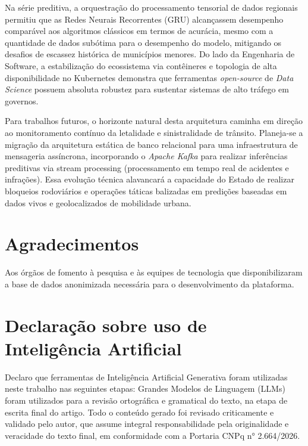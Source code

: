 \documentclass[10pt,conference]{IEEEtran}
\begin{document}
Na série preditiva, a orquestração do processamento tensorial de dados regionais permitiu que as Redes Neurais Recorrentes (GRU) alcançassem desempenho comparável aos algoritmos clássicos em termos de acurácia, mesmo com a quantidade de dados subótima para o desempenho do modelo, mitigando os desafios de escassez histórica de municípios menores. Do lado da Engenharia de Software, a estabilização do ecossistema via contêineres e topologia de alta disponibilidade no Kubernetes demonstra que ferramentas \textit{open-source} de \textit{Data Science} possuem absoluta robustez para sustentar sistemas de alto tráfego em governos.

Para trabalhos futuros, o horizonte natural desta arquitetura caminha em direção ao monitoramento contínuo da letalidade e sinistralidade de trânsito. Planeja-se a migração da arquitetura estática de banco relacional para uma infraestrutura de mensageria assíncrona, incorporando o \textit{Apache Kafka} para realizar inferências preditivas via stream processing (processamento em tempo real de acidentes e infrações). Essa evolução técnica alavancará a capacidade do Estado de realizar bloqueios rodoviários e operações táticas balizadas em predições baseadas em dados vivos e geolocalizados de mobilidade urbana.



\section*{Agradecimentos}
Aos órgãos de fomento à pesquisa e às equipes de tecnologia que disponibilizaram a base de dados anonimizada necessária para o desenvolvimento da plataforma.

\section*{Declaração sobre uso de Inteligência Artificial}
Declaro que ferramentas de Inteligência Artificial Generativa foram utilizadas neste trabalho nas seguintes etapas: Grandes Modelos de Linguagem (LLMs) foram utilizados para a revisão ortográfica e gramatical do texto, na etapa de escrita final do artigo. Todo o conteúdo gerado foi revisado criticamente e validado pelo autor, que assume integral responsabilidade pela originalidade e veracidade do texto final, em conformidade com a Portaria CNPq n° 2.664/2026.



\end{document}
